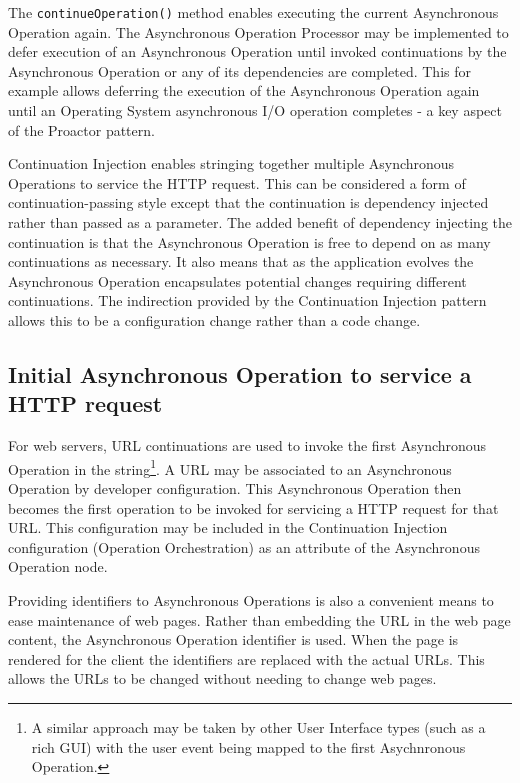 \documentclass[prodmode]{style/acmlarge}
\begin{document}
The \texttt{continueOperation()} method enables executing the current
Asynchronous Operation again.  The Asynchronous Operation Processor may be
implemented to defer execution of an Asynchronous Operation until invoked
continuations by the Asynchronous Operation or any of its dependencies are
completed.  This for example allows deferring the execution of the Asynchronous
Operation again until an Operating System asynchronous I/O operation completes -
a key aspect of the Proactor pattern.

Continuation Injection enables stringing together multiple Asynchronous
Operations to service the HTTP request.  This can be considered a form of
continuation-passing style \cite{continuations} except that the continuation is
dependency injected rather than passed as a parameter.  The added benefit of
dependency injecting the continuation is that the Asynchronous Operation is free
to depend on as many continuations as necessary.  It also means that as the
application evolves the Asynchronous Operation encapsulates potential changes
requiring different continuations.  The indirection provided by the Continuation
Injection pattern allows this to be a configuration change rather than a code
change.


\subsection{Initial Asynchronous Operation to service a HTTP request}

For web servers, URL continuations \cite{url-continuation} are used to invoke
the first Asynchronous Operation in the string\footnote{A similar approach may
be taken by other User Interface types (such as a rich GUI) with the user event
being mapped to the first Asychnronous Operation.}.  A URL may be associated to
an Asynchronous Operation by developer configuration.  This Asynchronous
Operation then becomes the first operation to be invoked for servicing a HTTP
request for that URL.  This configuration may be included in the Continuation
Injection configuration (Operation Orchestration) as an attribute of the
Asynchronous Operation node.

Providing identifiers to Asynchronous Operations is also a convenient means to
ease maintenance of web pages.  Rather than embedding the URL in the web page
content, the Asynchronous Operation identifier is used.  When the page is
rendered for the client the identifiers are replaced with the actual URLs.
This allows the URLs to be changed without needing to change web pages.
\end{document}
